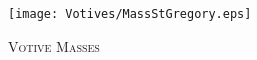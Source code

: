 \fancyhead[RE,LO]{}\fancyhead[RO,LE]{}
\fancyhead[C]{}\thispagestyle{empty}
{}

\begin{figure}[H]
    \centering
    \texttt{[image: Votives/MassStGregory.eps]}
    \caption{\textsc{\Huge{Votive Masses}}}
\end{figure}